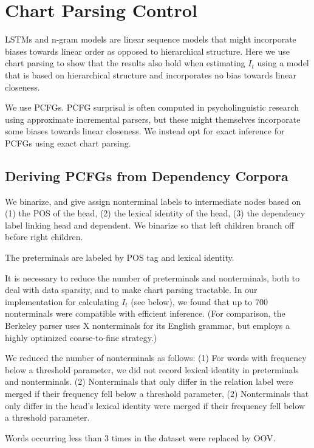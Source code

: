 \documentclass[11pt,letterpaper]{article}
\begin{document}
\section{Chart Parsing Control}

LSTMs and n-gram models are linear sequence models that might incorporate biases towards linear order as opposed to hierarchical structure.
Here we use chart parsing to show that the results also hold when estimating $I_t$ using a model that is based on hierarchical structure and incorporates no bias towards linear closeness.

We use PCFGs.
PCFG surprisal is often computed in psycholinguistic research using approximate incremental parsers, but these might themselves incorporate some biases towards linear closeness.
We instead opt for exact inference for PCFGs using exact chart parsing.

\subsection{Deriving PCFGs from Dependency Corpora}



We binarize, and give assign nonterminal labels to intermediate nodes based on (1) the POS of the head, (2) the lexical identity of the head, (3) the dependency label linking head and dependent.
We binarize so that left children branch off before right children.

The preterminals are labeled by POS tag and lexical identity.

It is necessary to reduce the number of preterminals and nonterminals, both to deal with data sparsity, and to make chart parsing tractable.
In our implementation for calculating $I_t$ (see below), we found that up to 700 nonterminals were compatible with efficient inference.
(For comparison, the Berkeley parser uses X nonterminals for its English grammar, but employs a highly optimized coarse-to-fine strategy.)

We reduced the number of nonterminals as follows:
(1) For words with frequency below a threshold parameter, we did not record lexical identity in preterminals and nonterminals.
(2) Nonterminals that only differ in the relation label were merged if their frequency fell below a threshold parameter,
(2) Nonterminals that only differ in the head's lexical identity were merged if their frequency fell below a threshold parameter.

Words occurring less than 3 times in the dataset were replaced by OOV.
\end{document}

